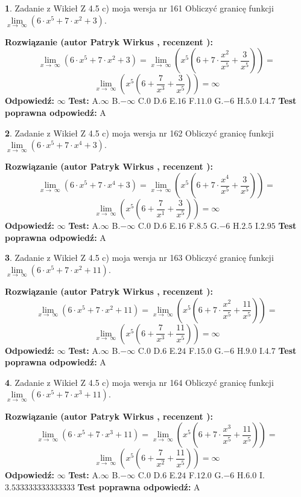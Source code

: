 \documentclass[12pt, a4paper]{article}
\theoremstyle{definition} %
\newtheorem{zad}{}
\newcommand{\zadStart}[1]{\begin{zad}#1\newline}
\newcommand{\zadStop}{\end{zad}}
\newcommand{\rozwStart}[2]{\noindent \textbf{Rozwiązanie (autor #1 , recenzent #2): }\newline}
\newcommand{\rozwStop}{\newline}
\newcommand{\odpStart}{\noindent \textbf{Odpowiedź:}\newline}
\newcommand{\odpStop}{\newline}
\newcommand{\testStart}{\noindent \textbf{Test:}\newline}
\newcommand{\testStop}{\newline}
\newcommand{\kluczStart}{\noindent \textbf{Test poprawna odpowiedź:}\newline}
\newcommand{\kluczStop}{\newline}
\begin{document}
\zadStart{Zadanie z Wikieł Z 4.5 c) moja wersja nr 161}
Obliczyć granicę funkcji  $\lim\limits_{x\to\ \infty}(6 \cdot x^{5}+7 \cdot x^{2}+3)$.
\zadStop
\rozwStart{Patryk Wirkus}{}
$$\lim\limits_{x\to\ \infty}(6 \cdot x^{5}+7 \cdot x^{2}+3) = \lim\limits_{x\to\ \infty}(x^{5}(6 +7 \cdot \frac{x^{2}}{x^{5}}+\frac{3}{x^{5}})) =$$ $$\lim\limits_{x\to\ \infty}(x^{5}(6 +\frac{7}{x^{3}}+\frac{3}{x^{5}})) =\infty$$
\rozwStop
\odpStart
$\infty$
\odpStop
\testStart
A.$\infty$ B.$-\infty$ C.$0$ D.$6$ E.$16$
F.$11.0$ G.$-6$
H.$5.0$
I.$4.7$
\testStop
\kluczStart
A
\kluczStop



\zadStart{Zadanie z Wikieł Z 4.5 c) moja wersja nr 162}
Obliczyć granicę funkcji  $\lim\limits_{x\to\ \infty}(6 \cdot x^{5}+7 \cdot x^{4}+3)$.
\zadStop
\rozwStart{Patryk Wirkus}{}
$$\lim\limits_{x\to\ \infty}(6 \cdot x^{5}+7 \cdot x^{4}+3) = \lim\limits_{x\to\ \infty}(x^{5}(6 +7 \cdot \frac{x^{4}}{x^{5}}+\frac{3}{x^{5}})) =$$ $$\lim\limits_{x\to\ \infty}(x^{5}(6 +\frac{7}{x^{1}}+\frac{3}{x^{5}})) =\infty$$
\rozwStop
\odpStart
$\infty$
\odpStop
\testStart
A.$\infty$ B.$-\infty$ C.$0$ D.$6$ E.$16$
F.$8.5$ G.$-6$
H.$2.5$
I.$2.95$
\testStop
\kluczStart
A
\kluczStop



\zadStart{Zadanie z Wikieł Z 4.5 c) moja wersja nr 163}
Obliczyć granicę funkcji  $\lim\limits_{x\to\ \infty}(6 \cdot x^{5}+7 \cdot x^{2}+11)$.
\zadStop
\rozwStart{Patryk Wirkus}{}
$$\lim\limits_{x\to\ \infty}(6 \cdot x^{5}+7 \cdot x^{2}+11) = \lim\limits_{x\to\ \infty}(x^{5}(6 +7 \cdot \frac{x^{2}}{x^{5}}+\frac{11}{x^{5}})) =$$ $$\lim\limits_{x\to\ \infty}(x^{5}(6 +\frac{7}{x^{3}}+\frac{11}{x^{5}})) =\infty$$
\rozwStop
\odpStart
$\infty$
\odpStop
\testStart
A.$\infty$ B.$-\infty$ C.$0$ D.$6$ E.$24$
F.$15.0$ G.$-6$
H.$9.0$
I.$4.7$
\testStop
\kluczStart
A
\kluczStop



\zadStart{Zadanie z Wikieł Z 4.5 c) moja wersja nr 164}
Obliczyć granicę funkcji  $\lim\limits_{x\to\ \infty}(6 \cdot x^{5}+7 \cdot x^{3}+11)$.
\zadStop
\rozwStart{Patryk Wirkus}{}
$$\lim\limits_{x\to\ \infty}(6 \cdot x^{5}+7 \cdot x^{3}+11) = \lim\limits_{x\to\ \infty}(x^{5}(6 +7 \cdot \frac{x^{3}}{x^{5}}+\frac{11}{x^{5}})) =$$ $$\lim\limits_{x\to\ \infty}(x^{5}(6 +\frac{7}{x^{2}}+\frac{11}{x^{5}})) =\infty$$
\rozwStop
\odpStart
$\infty$
\odpStop
\testStart
A.$\infty$ B.$-\infty$ C.$0$ D.$6$ E.$24$
F.$12.0$ G.$-6$
H.$6.0$
I.$3.533333333333333$
\testStop
\kluczStart
A
\kluczStop
\end{document}
